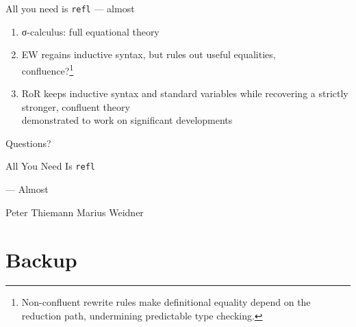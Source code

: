 \documentclass[pdftex,aspectratio=169]{beamer}
\newcommand{\refl}{\texttt{refl}}
\begin{document}
\begin{frame}{All you need is \refl{} --- almost}
      \begin{enumerate}
        \item σ-calculus: full equational theory
        \item EW regains inductive syntax,
          but rules out useful equalities, \\
          confluence?\footnote{Non-confluent rewrite rules make definitional equality depend on the reduction path, undermining predictable type checking.}
        \item RoR keeps inductive syntax and standard variables while recovering
          a strictly stronger, confluent theory \\
          demonstrated to work on significant developments
      \end{enumerate}

\end{frame}



\begin{frame}{Questions?}
  \begin{center}
    \vspace{.8em}
    \Huge All You Need Is \refl

    \vspace{.35em}
    \Large --- Almost

    \vspace{1.5em}
    \normalsize
    Peter Thiemann \quad Marius Weidner
  \end{center}
\end{frame}

\appendix
\section{Backup}
\end{document}

